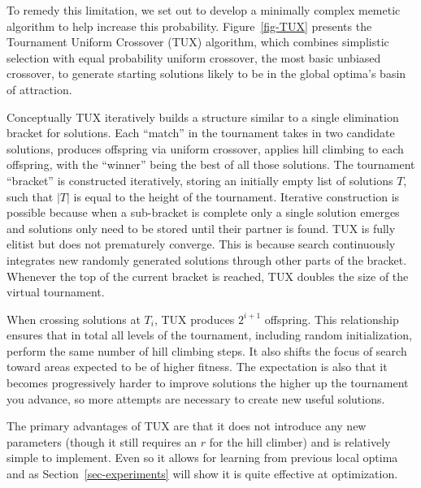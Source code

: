 To remedy this limitation, we set out to develop a minimally complex memetic
algorithm to help increase this probability. Figure~\ref{fig-TUX} presents
the Tournament Uniform Crossover (TUX) algorithm, which combines simplistic
selection with equal probability uniform crossover, the most basic unbiased crossover, to generate starting
solutions likely to be in the global optima's basin of attraction.

Conceptually TUX iteratively builds a structure similar to a single elimination
bracket for solutions. Each ``match'' in the tournament takes in two candidate solutions,
produces offspring via uniform crossover, applies hill climbing to each offspring, with
the ``winner'' being the best of all those solutions. The tournament ``bracket'' is constructed
iteratively, storing an initially empty list of solutions $T$, such that $|T|$ is equal to the height
of the tournament. Iterative construction is possible because when a sub-bracket is complete only a single solution
emerges and solutions only need to be stored until their partner is found.
TUX is fully elitist but does not prematurely converge. This is because search continuously
integrates new randomly generated solutions through other parts of the bracket. Whenever the
top of the current bracket is reached, TUX doubles the size of the virtual tournament.

When crossing solutions at $T_i$, TUX produces $2^{i+1}$ offspring. This relationship
ensures that in total all levels of the tournament, including random initialization,
perform the same number of hill climbing steps. It also shifts the focus of search toward
areas expected to be of higher fitness. The expectation is also that it becomes progressively
harder to improve solutions the higher up the tournament you advance, so more attempts
are necessary to create new useful solutions.

The primary advantages of TUX are that it does not introduce any new parameters (though it still
requires an $r$ for the hill climber) and is relatively simple to implement. Even so
it allows for learning from previous local optima and as Section~\ref{sec-experiments}
will show it is quite effective at optimization.
